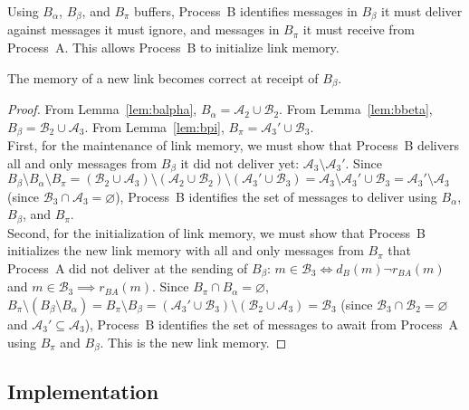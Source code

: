 \noindent Using $B_\alpha$, $B_\beta$, and $B_\pi$ buffers, Process~B identifies
messages in $B_\beta$ it must deliver against messages it must ignore, and
messages in $B_\pi$ it must receive from Process~A. This allows Process~B to
initialize link memory.

\begin{theorem}
  The memory of a new link becomes correct at receipt of $B_\beta$.
\end{theorem}

\begin{proof}
  From Lemma~\ref{lem:balpha}, $B_\alpha = \mathcal{A}_2 \cup \mathcal{B}_2$.
  From Lemma~\ref{lem:bbeta}, $B_\beta= \mathcal{B}_2 \cup \mathcal{A}_3$. From
  Lemma~\ref{lem:bpi}, $B_\pi = \mathcal{A}_3' \cup \mathcal{B}_3$. \\ First,
  for the maintenance of link memory, we must show that Process~B delivers all
  and only messages from $B_\beta$ it did not deliver yet:
  $\mathcal{A}_3 \setminus \mathcal{A}_3'$. Since
  $B_\beta \setminus B_\alpha \setminus B_\pi = (\mathcal{B}_2 \cup
  \mathcal{A}_3) \setminus (\mathcal{A}_2 \cup \mathcal{B}_2) \setminus
  (\mathcal{A}_3' \cup \mathcal{B}_3) = \mathcal{A}_3 \setminus \mathcal{A}_3'
  \cup \mathcal{B}_3 = \mathcal{A}_3'\setminus \mathcal{A}_3$
  (since $\mathcal{B}_3 \cap \mathcal{A}_3 = \varnothing$), Process~B identifies
  the set of messages to deliver using $B_\alpha$, $B_\beta$, and $B_\pi$. \\
  Second, for the initialization of link memory, we must show that Process~B
  initializes the new link memory with all and only messages from $B_\pi$ that
  Process~A did not deliver at the sending of $B_\beta$:
  $m \in \mathcal{B}_3 \Leftrightarrow d_B(m) \neg r_{BA}(m)$ and
  $m \in \mathcal{B}_3 \implies r_{BA}(m)$.  Since
  $B_\pi \cap B_\alpha = \varnothing$,
  $B_\pi \setminus (B_\beta \setminus B_\alpha)= B_\pi \setminus B_\beta =
  (\mathcal{A}_3' \cup \mathcal{B}_3) \setminus (\mathcal{B}_2 \cup
  \mathcal{A}_3) = \mathcal{B}_3$
  (since $\mathcal{B}_3 \cap \mathcal{B}_2 = \varnothing$ and
  $\mathcal{A}_3' \subseteq \mathcal{A}_3$), Process~B identifies the set of
  messages to await from Process~A using $B_\pi$ and $B_\beta$. This is the new
  link memory.
\end{proof}

\subsection{Implementation}

